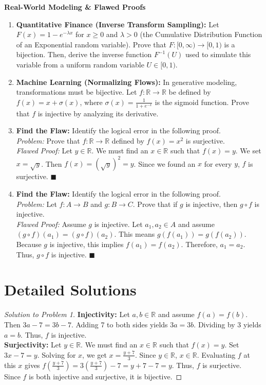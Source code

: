 \documentclass[11pt, letterpaper]{article}
\theoremstyle{definition}
\theoremstyle{remark}
\newcommand{\R}{\mathbb{R}}
\begin{document}
\textbf{Real-World Modeling \& Flawed Proofs}

\begin{enumerate}[label=\textbf{\arabic*.}, resume]
    \item \textbf{Quantitative Finance (Inverse Transform Sampling):} Let $F(x) = 1 - e^{-\lambda x}$ for $x \ge 0$ and $\lambda > 0$ (the Cumulative Distribution Function of an Exponential random variable). Prove that $F : [0, \infty) \to [0, 1)$ is a bijection. Then, derive the inverse function $F^{-1}(U)$ used to simulate this variable from a uniform random variable $U \in [0, 1)$.
    \item \textbf{Machine Learning (Normalizing Flows):} In generative modeling, transformations must be bijective. Let $f : \R \to \R$ be defined by $f(x) = x + \sigma(x)$, where $\sigma(x) = \frac{1}{1+e^{-x}}$ is the sigmoid function. Prove that $f$ is injective by analyzing its derivative.
    \item \textbf{Find the Flaw:} Identify the logical error in the following proof. \\
    \textit{Problem:} Prove that $f : \R \to \R$ defined by $f(x) = x^2$ is surjective. \\
    \textit{Flawed Proof:} Let $y \in \R$. We must find an $x \in \R$ such that $f(x) = y$. We set $x = \sqrt{y}$. Then $f(x) = (\sqrt{y})^2 = y$. Since we found an $x$ for every $y$, $f$ is surjective. $\blacksquare$
    \item \textbf{Find the Flaw:} Identify the logical error in the following proof. \\
    \textit{Problem:} Let $f : A \to B$ and $g : B \to C$. Prove that if $g$ is injective, then $g \circ f$ is injective. \\
    \textit{Flawed Proof:} Assume $g$ is injective. Let $a_1, a_2 \in A$ and assume $(g \circ f)(a_1) = (g \circ f)(a_2)$. This means $g(f(a_1)) = g(f(a_2))$. Because $g$ is injective, this implies $f(a_1) = f(a_2)$. Therefore, $a_1 = a_2$. Thus, $g \circ f$ is injective. $\blacksquare$
\end{enumerate}

\newpage

\section{Detailed Solutions}

\begin{proof}[Solution to Problem 1]
\textbf{Injectivity:} Let $a, b \in \R$ and assume $f(a) = f(b)$. Then $3a - 7 = 3b - 7$. Adding 7 to both sides yields $3a = 3b$. Dividing by 3 yields $a = b$. Thus, $f$ is injective. \\
\textbf{Surjectivity:} Let $y \in \R$. We must find an $x \in \R$ such that $f(x) = y$. Set $3x - 7 = y$. Solving for $x$, we get $x = \frac{y + 7}{3}$. Since $y \in \R$, $x \in \R$. Evaluating $f$ at this $x$ gives $f\left(\frac{y + 7}{3}\right) = 3\left(\frac{y + 7}{3}\right) - 7 = y + 7 - 7 = y$. Thus, $f$ is surjective. \\
Since $f$ is both injective and surjective, it is bijective.
\end{proof}
\end{document}
